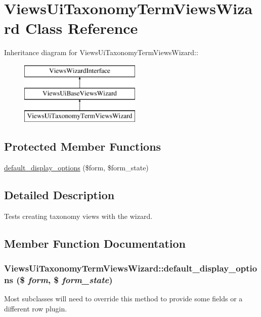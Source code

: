 \hypertarget{classViewsUiTaxonomyTermViewsWizard}{
\section{ViewsUiTaxonomyTermViewsWizard Class Reference}
\label{classViewsUiTaxonomyTermViewsWizard}
}
Inheritance diagram for ViewsUiTaxonomyTermViewsWizard::\begin{figure}[H]
\begin{center}
\leavevmode
\includegraphics[height=3cm]{classViewsUiTaxonomyTermViewsWizard}
\end{center}
\end{figure}
\subsection*{Protected Member Functions}
\begin{DoxyCompactItemize}
\item 
\hyperlink{classViewsUiTaxonomyTermViewsWizard_a167a991a251ca4cd9958552134095511}{default\_\-display\_\-options} (\$form, \$form\_\-state)
\end{DoxyCompactItemize}


\subsection{Detailed Description}
Tests creating taxonomy views with the wizard. 

\subsection{Member Function Documentation}
\hypertarget{classViewsUiTaxonomyTermViewsWizard_a167a991a251ca4cd9958552134095511}{
\subsubsection[{default\_\-display\_\-options}]{\setlength{\rightskip}{0pt plus 5cm}ViewsUiTaxonomyTermViewsWizard::default\_\-display\_\-options (\$ {\em form}, \/  \$ {\em form\_\-state})}}
\label{classViewsUiTaxonomyTermViewsWizard_a167a991a251ca4cd9958552134095511}
Most subclasses will need to override this method to provide some fields or a different row plugin. 

